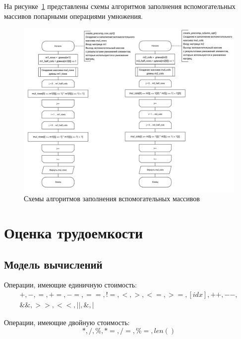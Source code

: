 На рисунке~\ref{fig:winograd_opt_scheme_3} представлены схемы алгоритмов заполнения вспомогательных массивов попарными операциями умножения.

\begin{figure}[H]
\centering
\includegraphics[width=\textwidth]{inc/img/winograd_opt_3.pdf}
\caption{Схемы алгоритмов заполнения вспомогательных массивов}
\label{fig:winograd_opt_scheme_3}
\end{figure}

\section{Оценка трудоемкости}

\subsection{Модель вычислений}\label{sub:model}

Операции, имеющие единичную стоимость:
\begin{equation}
    \begin{gathered}
        +, -, =, +=, -=, ==, !=, <, >, <=, >=, [idx], ++, {-}-,\\
        \&\&, >>, <<, ||, \&, |
    \end{gathered}
\end{equation}

Операции, имеющие двойную стоимость:
\begin{equation}
    *, /, \%, *=, /=, \%=, len()
\end{equation}

